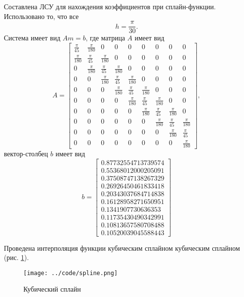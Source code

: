 Составлена ЛСУ для нахождения коэффициентов при сплайн-функции.
Использовано то, что все
$$h =
  \frac{ \pi }{30}.$$
Система имеет вид $Am = b$, где матрица $A$ имеет вид
$$A =
  \begin{bmatrix}
    \frac{ \pi }{45} & \frac{ \pi }{180} & 0 & 0 & 0 & 0 & 0 & 0 & 0 \\
    \frac{ \pi }{180} & \frac{ \pi }{45} & \frac{ \pi }{180} & 0 & 0 & 0 & 0 & 0 & 0 \\
    0 & \frac{ \pi }{180} & \frac{ \pi }{45} & \frac{ \pi }{180} & 0 & 0 & 0 & 0 & 0 \\
    0 & 0 & \frac{ \pi }{180} & \frac{ \pi }{45} & \frac{ \pi }{180} & 0 & 0 & 0 & 0 \\
    0 & 0 & 0 & \frac{ \pi }{180} & \frac{ \pi }{45} & \frac{ \pi }{180} & 0 & 0 & 0 \\
    0 & 0 & 0 & 0 & \frac{ \pi }{180} & \frac{ \pi }{45} & \frac{ \pi }{180} & 0 & 0 \\
    0 & 0 & 0 & 0 & 0 & \frac{ \pi }{180} & \frac{ \pi }{45} & \frac{ \pi }{180} & 0 \\
    0 & 0 & 0 & 0 & 0 & 0 & \frac{ \pi }{180} & \frac{ \pi }{45} & \frac{ \pi }{180} \\
    0 & 0 & 0 & 0 & 0 & 0 & 0 & \frac{ \pi }{180} & \frac{ \pi }{45} \\
    0 & 0 & 0 & 0 & 0 & 0 & 0 & 0 & \frac{ \pi }{180}
  \end{bmatrix},$$
вектор-столбец $b$ имеет вид
$$b =
  \begin{bmatrix}
    0.87732554713739574 \\
    0.55368012000205091 \\
    0.37508747138267329 \\
    0.26926450461833418 \\
    0.20343037684714838 \\
    0.16128958271650951 \\
    0.1341907730636353 \\
    0.11735430490342991 \\
    0.10813657580708488 \\
    0.10520039045588443
  \end{bmatrix}$$

Проведена интерполяция функции кубическим сплайном кубическим сплайном (рис. \ref{fig:spline}).

\begin{figure}[h!]
  \centering
  \texttt{[image: ../code/spline.png]}
  \caption{Кубический сплайн}
  \label{fig:spline}
\end{figure}

